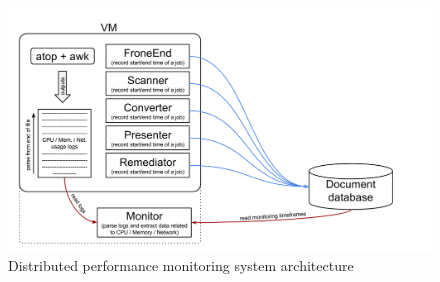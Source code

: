 \begin{figure}
\centering
\includegraphics[width=\linewidth]{./img/MonitoringCPUMechanismExtended.png}
\caption{Distributed performance monitoring system architecture}
\label{fig:monitoringArchitectureExtended}
\end{figure}
